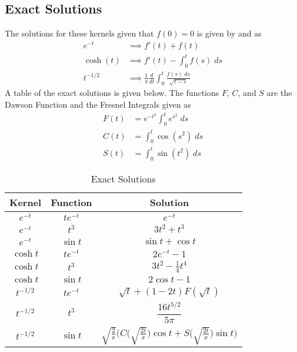 \documentclass[11pt]{article}
\numberwithin{equation}{section}
\theoremstyle{definition}
\begin{document}
\subsection{Exact Solutions}
The solutions for these kernels given
that $f(0) = 0$ is given by \cite{handbook} and \cite{abel} as
\begin{align}
\label{kernel1_soln}  e^{-t} &\implies f'(t) + f(t) \\
\label{kernel2_soln} \cosh(t) &\implies f'(t) - \int_0^t f(s) \; ds \\
\label{kernel3_soln} t^{-1/2} &\implies \frac{1}{\pi}\frac{d}{dt}\int_0^t \frac{f(s) \; ds}{\sqrt{t - s}}
\end{align}
A table of the exact solutions is given below. The functions $F$, $C$, and $S$ are
the Dawson Function and the Fresnel Integrals given as 
\begin{align}
\label{dawson}    F(t) &= e^{-t^2}\int_0^t e^{s^2}\; ds \\
\label{fresnel_c} C(t) &= \int_0^t \cos(s^2) \; ds \\
\label{fresnel_s} S(t) &= \int_0^t \sin(t^2) \; ds
\end{align}
\renewcommand{\arraystretch}{2.0}
\begin{table}[H]
  \caption{Exact Solutions}
  \label{exact_solutions}
  \begin{center}
  \begin{tabular}{|c|c|c|}
  \hline
  Kernel & Function & Solution \\ \hline
  $e^{-t}$ & $te^{-t}$ & $e^{-t}$ \\ \hline
  $e^{-t}$ & $t^3$ & $3t^2 + t^3$ \\ \hline
  $e^{-t}$ & $\sin t$ & $\sin t + \cos t$  \\ \hline
  $\cosh t$ & $te^{-t}$ & $2e^{-t} - 1$\\ \hline
  $\cosh t$ & $t^3$ & $3t^2 - \frac{1}{4}t^4$\\ \hline
  $\cosh t$ & $\sin t$ & $2\cos t - 1$\\ \hline
  $t^{-1/2}$ & $te^{-t}$ & $\sqrt{t} + (1-2t)F(\sqrt{t})$\\ \hline
  $t^{-1/2}$ & $t^3$ & $\dfrac{16 t^{5/2}}{5\pi}$\\ \hline
  $t^{-1/2}$ & $\sin t$ & $\sqrt{\frac{2}{\pi}} \bigg(C\big(\sqrt{\frac{2t}{\pi}}\big) \cos t  + S\big(\sqrt{\frac{2t}{\pi}}\big)\sin t  \bigg)$\\
  \hline
  \end{tabular}
  \end{center}
\end{table}
\end{document}
